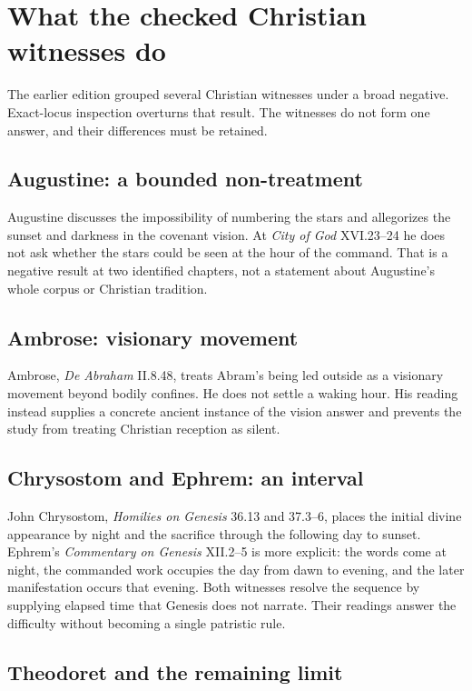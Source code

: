\section{What the checked Christian witnesses do}

The earlier edition grouped several Christian witnesses under a broad
negative. Exact-locus inspection overturns that result. The witnesses do not
form one answer, and their differences must be retained.

\subsection{Augustine: a bounded non-treatment}

Augustine discusses the impossibility of numbering the stars and allegorizes
the sunset and darkness in the covenant vision. At \textit{City of God}
XVI.23--24 he does not ask whether the stars could be seen at the hour of the
command. That is a negative result at two identified chapters, not a statement
about Augustine's whole corpus or Christian tradition.

\subsection{Ambrose: visionary movement}

Ambrose, \textit{De Abraham} II.8.48, treats Abram's being led outside as a
visionary movement beyond bodily confines. He does not settle a waking hour.
His reading instead supplies a concrete ancient instance of the vision answer
and prevents the study from treating Christian reception as silent.

\subsection{Chrysostom and Ephrem: an interval}

John Chrysostom, \textit{Homilies on Genesis} 36.13 and 37.3--6, places the
initial divine appearance by night and the sacrifice through the following day
to sunset. Ephrem's \textit{Commentary on Genesis} XII.2--5 is more explicit:
the words come at night, the commanded work occupies the day from dawn to
evening, and the later manifestation occurs that evening. Both witnesses
resolve the sequence by supplying elapsed time that Genesis does not narrate.
Their readings answer the difficulty without becoming a single patristic rule.

\subsection{Theodoret and the remaining limit}

